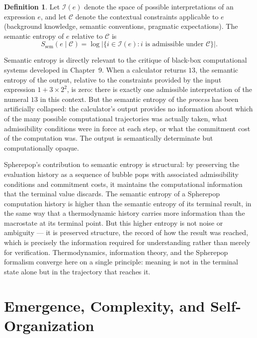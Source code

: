 \documentclass[12pt,openany]{book}
\theoremstyle{plain}
\theoremstyle{definition}
\newtheorem{definition}[theorem]{Definition}
\theoremstyle{remark}
\begin{document}
\begin{definition}
Let $\mathcal{I}(e)$ denote the space of possible interpretations of an expression $e$, and let $\mathcal{C}$ denote the contextual constraints applicable to $e$ (background knowledge, semantic conventions, pragmatic expectations). The semantic entropy of $e$ relative to $\mathcal{C}$ is
\[
  S_{\mathrm{sem}}(e \mid \mathcal{C}) = \log \lvert \{ i \in \mathcal{I}(e) : i \text{ is admissible under } \mathcal{C} \} \rvert.
\]
\end{definition}

Semantic entropy is directly relevant to the critique of black-box computational systems developed in Chapter~9. When a calculator returns $13$, the semantic entropy of the output, relative to the constraints provided by the input expression $1 + 3 \times 2^2$, is zero: there is exactly one admissible interpretation of the numeral $13$ in this context. But the semantic entropy of the \emph{process} has been artificially collapsed: the calculator's output provides no information about which of the many possible computational trajectories was actually taken, what admissibility conditions were in force at each step, or what the commitment cost of the computation was. The output is semantically determinate but computationally opaque.

Spherepop's contribution to semantic entropy is structural: by preserving the evaluation history as a sequence of bubble pops with associated admissibility conditions and commitment costs, it maintains the computational information that the terminal value discards. The semantic entropy of a Spherepop computation history is higher than the semantic entropy of its terminal result, in the same way that a thermodynamic history carries more information than the macrostate at its terminal point. But this higher entropy is not noise or ambiguity — it is preserved structure, the record of how the result was reached, which is precisely the information required for understanding rather than merely for verification. Thermodynamics, information theory, and the Spherepop formalism converge here on a single principle: meaning is not in the terminal state alone but in the trajectory that reaches it.

 \clearpage

\part{Emergence, Complexity, and Self-Organization}
\end{document}

